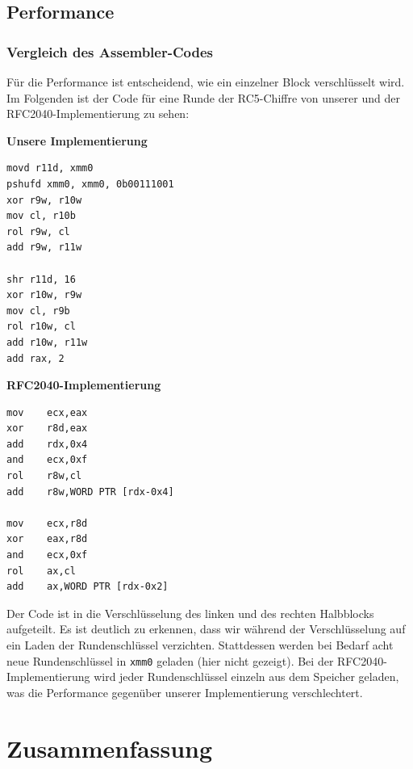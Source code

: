 \documentclass[course=erap]{aspdoc}
\begin{document}
\subsection{Performance}

\subsubsection{Vergleich des Assembler-Codes}

Für die Performance ist entscheidend, wie ein einzelner Block verschlüsselt wird. Im Folgenden ist der Code für eine Runde der RC5-Chiffre von unserer und der RFC2040-Implementierung zu sehen:

\begin{multicols}{2}

\noindent \textbf{Unsere Implementierung}

\begin{verbatim}
movd r11d, xmm0
pshufd xmm0, xmm0, 0b00111001
xor r9w, r10w
mov cl, r10b
rol r9w, cl
add r9w, r11w

shr r11d, 16
xor r10w, r9w
mov cl, r9b
rol r10w, cl
add r10w, r11w
add rax, 2
\end{verbatim}

\noindent \textbf{RFC2040-Implementierung}

\begin{verbatim}
mov    ecx,eax
xor    r8d,eax
add    rdx,0x4
and    ecx,0xf
rol    r8w,cl
add    r8w,WORD PTR [rdx-0x4]

mov    ecx,r8d
xor    eax,r8d
and    ecx,0xf
rol    ax,cl
add    ax,WORD PTR [rdx-0x2]

\end{verbatim}

\end{multicols}

\noindent Der Code ist in die Verschlüsselung des linken und des rechten Halbblocks aufgeteilt. Es ist deutlich zu erkennen, dass wir während der Verschlüsselung auf ein Laden der Rundenschlüssel verzichten. Stattdessen werden bei Bedarf acht neue Rundenschlüssel in \texttt{xmm0} geladen (hier nicht gezeigt). Bei der RFC2040-Implementierung wird jeder Rundenschlüssel einzeln aus dem Speicher geladen, was die Performance gegenüber unserer Implementierung verschlechtert.

\section{Zusammenfassung}
\end{document}
